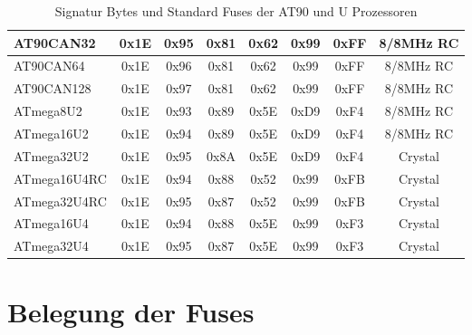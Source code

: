 \begin{table}[H]
\begin{center}
\begin{tabular}{| l | c | c | c || c | c | c | c |}
    \hline
AT90CAN32 & 0x1E & 0x95  & 0x81 & 0x62 & 0x99 & 0xFF & 8/8MHz RC \\
    \hline
AT90CAN64 & 0x1E & 0x96  & 0x81 & 0x62 & 0x99 & 0xFF & 8/8MHz RC \\
    \hline
AT90CAN128 & 0x1E & 0x97  & 0x81 & 0x62 & 0x99 & 0xFF & 8/8MHz RC \\
    \hline
ATmega8U2  & 0x1E & 0x93  & 0x89 & 0x5E & 0xD9 & 0xF4 & 8/8MHz RC \\
    \hline
ATmega16U2 & 0x1E & 0x94  & 0x89 & 0x5E & 0xD9 & 0xF4 & 8/8MHz RC \\
    \hline
ATmega32U2 & 0x1E & 0x95  & 0x8A & 0x5E & 0xD9 & 0xF4 & Crystal \\
    \hline
ATmega16U4RC & 0x1E & 0x94  & 0x88 & 0x52 & 0x99 & 0xFB & Crystal \\
    \hline
ATmega32U4RC & 0x1E & 0x95  & 0x87 & 0x52 & 0x99 & 0xFB & Crystal \\
    \hline
ATmega16U4 & 0x1E & 0x94  & 0x88 & 0x5E & 0x99 & 0xF3 & Crystal \\
    \hline
ATmega32U4 & 0x1E & 0x95  & 0x87 & 0x5E & 0x99 & 0xF3 & Crystal \\
    \hline
    \end{tabular}
  \end{center}
  \caption{Signatur Bytes und Standard Fuses der AT90 und U Prozessoren}
  \label{tab:at90Signature}
\end{table}

\section{Belegung der Fuses}


